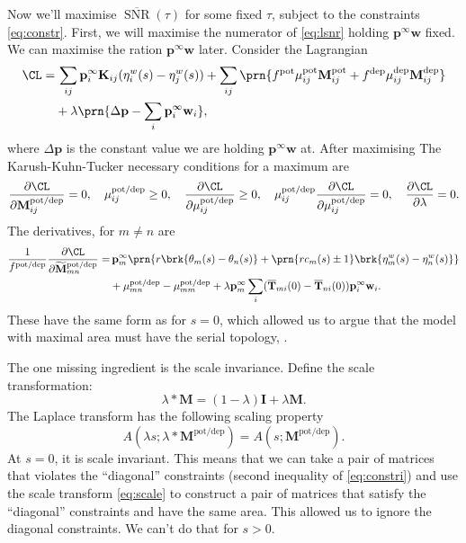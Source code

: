 \documentclass[12pt]{article}
\newcommand{\I}{\mathbf{I}}
\newcommand{\pr}{\mathbf{p}}
\newcommand{\eq}{\pr^\infty}
\newcommand{\fpt}{\mathbf{T}}
\newcommand{\fptb}{\overline{\fpt}}
\newcommand{\w}{\mathbf{w}}
\newcommand{\M}{\mathbf{M}}
\newcommand{\enc}{\mathbf{K}}
\newcommand{\pot}{^{\text{pot}}}
\newcommand{\dep}{^{\text{dep}}}
\newcommand{\potdep}{^{\text{pot/dep}}}
\newcommand{\Mh}{\widetilde{\M}}
\DeclareMathOperator{\snr}{SNR}
\newcommand{\snrb}{\overline{\snr}}
\renewcommand{\pdiff}[2]{\frac{\partial #1}{\partial #2}}
\begin{document}
Now we'll maximise $\snrb(\tau)$ for some fixed $\tau$, subject to the constraints \eqref{eq:constr}.
First, we will maximise the numerator of \eqref{eq:lsnr} holding $\eq\w$ fixed.
We can maximise the ration \wrt $\eq\w$ later.
Consider the Lagrangian
%
\begin{equation}\label{eq:finitelagrangian}
\begin{aligned}
  \CL =&\, \sum_{ij} \eq_i \enc_{ij} (\eta^w_i(s) - \eta^w_j(s))
        +\sum_{i j} \prn{ f\pot\mu\pot_{ij} \M\pot_{ij} + f\dep\mu\dep_{ij} \M\dep_{ij} }\\
        &+ \lambda \prn{ \Delta\pr - \sum_i \eq_i\w_i },
\end{aligned}
\end{equation}
%
where $\Delta\pr$ is the constant value we are holding $\eq\w$ at.
After maximising
The Karush-Kuhn-Tucker necessary conditions for a maximum are
%
\begin{equation}\label{eq:KTfinite}
  \pdiff{\CL}{\M\potdep_{ij}} = 0, \quad
  \mu\potdep_{ij} \geq 0, \quad
  \pdiff{\CL}{\mu\potdep_{ij}} \geq 0, \quad
  \mu\potdep_{ij}\pdiff{\CL}{\mu\potdep_{ij}} = 0, \quad
  \pdiff{\CL}{\lambda} = 0.
\end{equation}
%
The derivatives, for $m \neq n$ are
%
\begin{equation}\label{eq:finitederivs}
\begin{aligned}
  \frac{1}{f\potdep} \pdiff{\CL}{\Mh\potdep_{mn}} =& \,
      \eq_m \prn{ r \brk{\theta_m(s) - \theta_n(s)}
     +\prn{rc_m(s) \pm 1} \brk{\eta^w_m(s) - \eta^w_n(s)} } \\
     &+ \mu\potdep_{mn} -  \mu\potdep_{mm}  
     + \lambda \eq_m \sum_i (\fptb_{mi}(0)-\fptb_{ni}(0)) \eq_i\w_i.
\end{aligned}
\end{equation}
%
These have the same form as for $s=0$, which allowed us to argue that the model with maximal area must have the serial topology, \cite{Leibold2008serial,Ben-DayanRubin2007sparse}.

The one missing ingredient is the scale invariance.
Define the scale transformation:
%
\begin{equation}\label{eq:scale}
  \lambda * \M = (1-\lambda)\I + \lambda \M. 
\end{equation}
%
The Laplace transform has the following scaling property
%
\begin{equation}\label{eqlaplacescale}
  A(\lambda s;\lambda * \M\potdep) = A(s;\M\potdep).
\end{equation}
%
At $s=0$, it is scale invariant.
This means that we can take a pair of matrices that violates the ``diagonal'' constraints (second inequality of \eqref{eq:constri}) and use the scale transform \eqref{eq:scale} to construct a pair of matrices that satisfy the ``diagonal'' constraints and have the same area.
This allowed us to ignore the diagonal constraints.
We can't do that for $s>0$.
\end{document}
